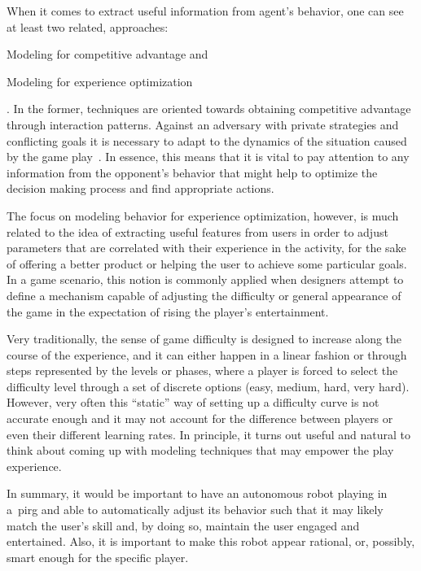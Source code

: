 When it comes to extract useful information from agent's behavior, one can see at least two related, approaches: \begin{inparaenum}\item Modeling for competitive advantage and \item Modeling for experience optimization\end{inparaenum}. In the former, techniques are oriented towards obtaining competitive advantage through interaction patterns. %
Against an adversary with private strategies and conflicting goals it is necessary to adapt to the dynamics of the situation caused by the game play~\citep{rofer_overview_2012}. In essence, this means that it is vital to pay attention to any information from the opponent's behavior that might help to optimize the decision making process and find appropriate actions.

The focus on modeling behavior for experience optimization, however, is much related to the idea of extracting useful features from users in order to adjust parameters that are correlated with their experience in the activity, for the sake of offering a better product or helping the user to achieve some particular goals. In a game scenario, this notion is commonly applied when designers attempt to define a mechanism capable of adjusting the difficulty or general appearance of the game in the expectation of rising the player's entertainment. 

Very traditionally, the sense of game difficulty is designed to increase along the course of the experience, and it can either happen in a linear fashion or through steps represented by the levels or phases, where a player is forced to select the difficulty level through a set of discrete options (easy, medium, hard, very hard). However, very often this ``static'' way of setting up a difficulty curve is not accurate enough and it may not account for the difference between players or even their different learning rates. %
In principle, it turns out useful and natural to think about coming up with modeling techniques that may empower the play experience. 

In summary, it would be important to have an autonomous robot playing in a~\gls{pirg} and able to automatically adjust its behavior such that it may likely match the user's skill and, by doing so, maintain the user engaged and entertained. Also, it is important to make this robot appear rational, or, possibly, smart enough for the specific player. 

